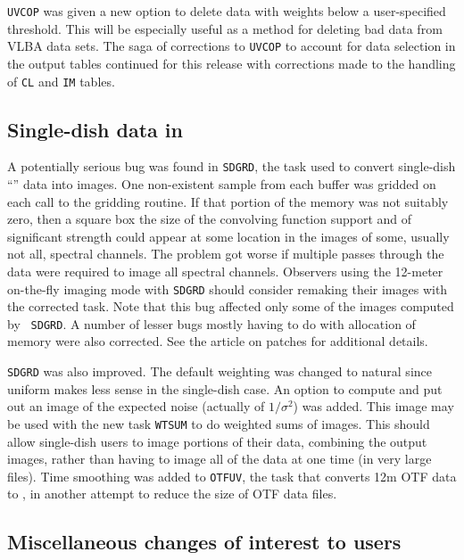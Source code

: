 {\tt UVCOP} was given a new option to delete data with weights below a
user-specified threshold.  This will be especially useful as a method
for deleting bad data from VLBA data sets.  The saga of corrections to
{\tt UVCOP} to account for data selection in the output tables
continued for this release with corrections made to the handling of
{\tt CL} and {\tt IM} tables.

\subsection{Single-dish data in \AIPS}

A potentially serious bug was found in {\tt SDGRD}, the task used to
convert single-dish ``\uv'' data into images.  One non-existent sample
from each buffer was gridded on each call to the gridding routine.  If
that portion of the memory was not suitably zero, then a square box
the size of the convolving function support and of significant
strength could appear at some location in the images of some, usually
not all, spectral channels.  The problem got worse if multiple passes
through the data were required to image all spectral channels.
Observers using the 12-meter on-the-fly imaging mode with {\tt SDGRD}
should consider remaking their images with the corrected task.  Note
that this bug affected only some of the images computed by \hbox{{\tt
SDGRD}}.  A number of lesser bugs mostly having to do with allocation
of memory were also corrected.  See the article on patches for
additional details.

{\tt SDGRD} was also improved.  The default weighting was changed to
natural since uniform makes less sense in the single-dish case.  An
option to compute and put out an image of the expected noise (actually
of $1/\sigma^2$) was added.  This image may be used with the new task
{\tt WTSUM} to do weighted sums of images.  This should allow
single-dish users to image portions of their data, combining the
output images, rather than having to image all of the data at one time
(in very large files).  Time smoothing was added to {\tt OTFUV}, the
task that converts 12m OTF data to \AIPS, in another attempt to reduce
the size of OTF data files.

\subsection{Miscellaneous changes of interest to users}

